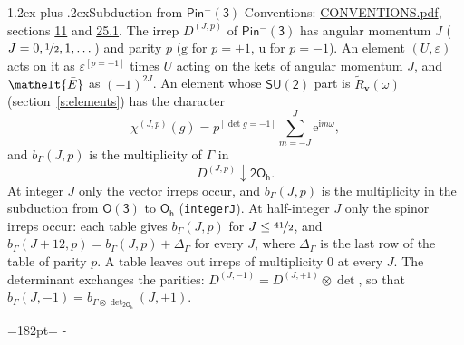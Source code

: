 \documentclass[10pt,a4paper]{article}
\makeatletter
\renewcommand\section{\@startsection{section}{1}{\z@}{-3ex plus -1ex minus -.2ex}%
  {1.2ex plus .2ex}{\normalfont\large\sffamily\bfseries\color{parttitle}}}
\newcommand{\needspace}[1]{\par\penalty-100\begingroup\dimen0=#1\relax\dimen2=\pagegoal
  \advance\dimen2-\pagetotal\ifdim\dimen0>\dimen2\relax\ifdim\dimen2>0pt\vfil\break\fi\fi
  \endgroup}
\numberwithin{equation}{section}
\newcommand{\eltfont}[1]{{\let\sigma\eltsigma\mathelt{#1}}}
\newcommand{\grp}[1]{\mathsf{#1}}
\newcommand{\elt}[1]{\eltfont{#1}}
\newcommand{\ptag}[1]{\mathrm{#1}}
\newcommand{\iverson}[1]{[#1]}
\newcommand{\restr}[2]{#1\!\downarrow#2}
\newcommand{\vv}{\mathbf{v}}
\newcommand{\iunit}{\mathrm{i}}
\newcommand{\expe}{\mathrm{e}}
\newcommand{\irrJp}[2]{D^{(#1,#2)}}
\newcommand{\irrprod}{\otimes}
\newcommand{\barred}[1]{\bar{#1}}
\newcommand{\lift}[1]{\tilde{#1}}
\makeatother
\begin{document}
\section{Subduction from \texorpdfstring{$\grp{Pin^{-}(3)}$}{Pin(3)}}\label{s:subduction_parent}
Conventions: \href{../../CONVENTIONS.pdf}{CONVENTIONS.pdf}, sections \href{../../../rotation/CONVENTIONS.pdf\#conv.11}{11} and \href{../../CONVENTIONS.pdf\#conv.25.1}{25.1}.
\leavevmode\label{n:index.J}\label{n:index.parity}\label{n:irrep.o3}The irrep $\irrJp{J}{p}$ of \href{Pinminus3.pdf}{$\grp{Pin^{-}(3)}$} has angular momentum $J$ ($J = 0, \nicefrac{1}{2}, 1, \dots$) and parity $p$ ($\ptag{g}$ for $p = +1$, $\ptag{u}$ for $p = -1$). An element $(U, \varepsilon)$ acts on it as $\varepsilon^{[p = -1]}$ times $U$ acting on the kets of angular momentum $J$, and $\elt{\barred{E}}$ as $(-1)^{2J}$. \label{n:function.character.parent}\label{n:function.multiplicity}An element whose $\grp{SU(2)}$ part is $\lift{R}_{\vv}(\omega)$ (section~\ref{s:elements}) has the character
\begin{equation}\label{e:chi}\chi^{(J,p)}(g) = p^{\iverson{\det g = -1}}\sum_{m=-J}^{J} \expe^{\iunit m\omega},\end{equation}
and $b_\Gamma(J, p)$ is the multiplicity of $\Gamma$ in
\begin{equation}\label{e:parent}\restr{\irrJp{J}{p}}{\grp{2O_{h}}}.\end{equation}
At integer $J$ only the vector irreps occur, and $b_\Gamma(J, p)$ is the multiplicity in the subduction from $\grp{O(3)}$ to \href{../../../rotation/data/pdf/Oh.pdf}{$\grp{O_{h}}$} (\texttt{integerJ}). \label{n:index.increment}At half-integer $J$ only the spinor irreps occur: each table gives $b_\Gamma(J, p)$ for $J \le \nicefrac{41}{2}$, and $b_\Gamma(J + 12, p) = b_\Gamma(J, p) + \Delta_\Gamma$ for every $J$, where $\Delta_\Gamma$ is the last row of the table of parity $p$. A table leaves out irreps of multiplicity 0 at every $J$.
\leavevmode\label{n:operator.determinant.character}The determinant exchanges the parities: $\irrJp{J}{-1} = \irrJp{J}{+1} \irrprod \det$, so that $b_\Gamma(J, -1) = b_{\Gamma \irrprod \det_{\grp{2O_{h}}}}(J, +1)$.
\needspace{182pt}
\end{document}
